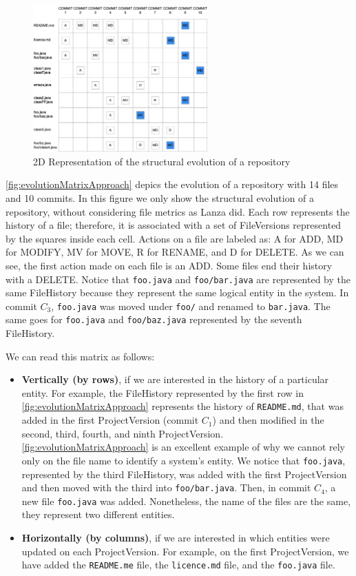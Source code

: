 \begin{figure}
    \center
    \includegraphics[width=0.6\textwidth]{2DMatrix.jpg}
    \caption{2D Representation of the structural evolution of a repository}
    \label{fig:evolutionMatrixApproach}
\end{figure}
\autoref{fig:evolutionMatrixApproach} depics the evolution of a repository with 14 files and 10 commits. In this figure we only show the structural evolution of a repository, without considering file metrics as Lanza did. 
Each row represents the history of a file; therefore, it is associated with a set of FileVersions represented by the squares inside each cell. Actions on a file are labeled as: A for ADD, MD for MODIFY, MV for MOVE, R for RENAME, and D for DELETE.
As we can see, the first action made on each file is an ADD. Some files end their history with a DELETE. Notice that \texttt{foo.java} and \texttt{foo/bar.java} are represented by the same FileHistory because they represent the same logical entity in the system. 
In commit $C_3$, \texttt{foo.java} was moved under \texttt{foo/} and renamed to  \texttt{bar.java}.
The same goes for \texttt{foo.java} and \texttt{foo/baz.java} represented by the seventh FileHistory.

We can read this matrix as follows:
 \begin{itemize}
     \item \textbf{Vertically (by rows)}, if we are interested in the history of a particular entity. 
     For example, the FileHistory represented by the first row in \autoref{fig:evolutionMatrixApproach} represents the history of \texttt{README.md}, that was added in the first ProjectVersion (commit $C_1$) and then modified in the second, third, fourth, and ninth ProjectVersion.
     \autoref{fig:evolutionMatrixApproach} is an excellent example of why we cannot rely only on the file name to identify a system's entity. 
     We notice that \texttt{foo.java}, represented by the third FileHistory, was added with the first ProjectVersion and then moved with the third into \texttt{foo/bar.java}. 
     Then, in commit $C_4$, a new file \texttt{foo.java} was added. Nonetheless, the name of the files are the same, they represent two different entities. 
     \item \textbf{Horizontally (by columns)}, if we are interested in which entities were updated on each ProjectVersion. 
    For example, on the first ProjectVersion, we have added the \texttt{README.me} file, the \texttt{licence.md} file, and the \texttt{foo.java} file. 
 \end{itemize}

